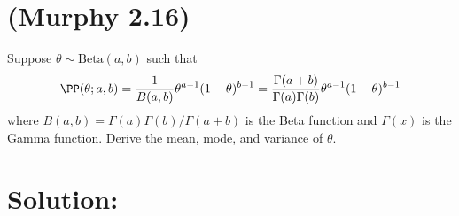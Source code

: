 \documentclass[189]{pset}
\begin{document}

  \section{(Murphy 2.16)}
    Suppose $\theta \sim \text{Beta}(a,b)$ such that
    \[
      \PP(\theta; a,b) = \frac{1}{B(a,b)} \theta^{a-1}(1-\theta)^{b-1}
      = \frac{\Gamma(a+b)}{\Gamma(a)\Gamma(b)}
      \theta^{a-1}(1-\theta)^{b-1}
    \]
    where $B(a,b) = \Gamma(a)\Gamma(b)/\Gamma(a+b)$ is the Beta
    function and $\Gamma(x)$ is the Gamma function. Derive the mean,
    mode, and variance of $\theta$.

  \hrulefill

  \section*{Solution:}
\end{document}
